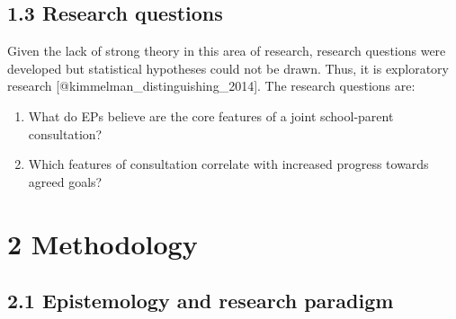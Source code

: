 \documentclass[
]{article}
\begin{document}
\hypertarget{research-questions}{%
\subsection{1.3 Research questions}\label{research-questions}}

Given the lack of strong theory in this area of research, research
questions were developed but statistical hypotheses could not be drawn.
Thus, it is exploratory research {[}@kimmelman\_distinguishing\_2014{]}.
The research questions are:

\begin{enumerate}
\def\labelenumi{\arabic{enumi}.}
\item
  What do EPs believe are the core features of a joint school-parent
  consultation?
\item
  Which features of consultation correlate with increased progress
  towards agreed goals?
\end{enumerate}

\hypertarget{methodology}{%
\section{2 Methodology}\label{methodology}}

\hypertarget{epistemology-and-research-paradigm}{%
\subsection{2.1 Epistemology and research
paradigm}\label{epistemology-and-research-paradigm}}
\end{document}
